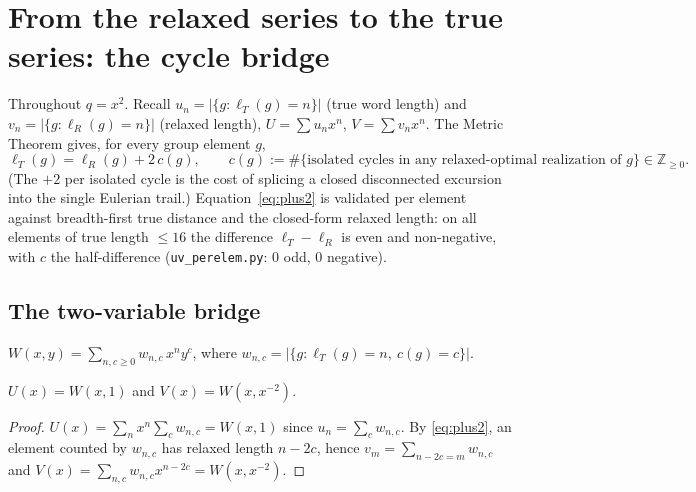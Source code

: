 
\section{From the relaxed series to the true series: the cycle bridge}
\label{sec:lifting}

Throughout $q=x^{2}$.  Recall $u_n=|\{g:\ell_T(g)=n\}|$ (true word length) and
$v_n=|\{g:\ell_R(g)=n\}|$ (relaxed length), $U=\sum u_nx^n$, $V=\sum v_nx^n$.
The Metric Theorem gives, for every group element $g$,
\begin{equation}\label{eq:plus2}
  \ell_T(g)=\ell_R(g)+2\,c(g),\qquad
  c(g):=\#\{\text{isolated cycles in any relaxed-optimal realization of }g\}\in\mathbb Z_{\ge0}.
\end{equation}
(The $+2$ per isolated cycle is the cost of splicing a closed disconnected excursion
into the single Eulerian trail.)  Equation~\eqref{eq:plus2} is validated per element
against breadth-first true distance and the closed-form relaxed length: on all
elements of true length $\le 16$ the difference $\ell_T-\ell_R$ is even and
non-negative, with $c$ the half-difference (\texttt{uv\_perelem.py}: $0$ odd, $0$
negative).

\subsection{The two-variable bridge}

\begin{definition}
$\displaystyle W(x,y)=\sum_{n,c\ge0}w_{n,c}\,x^{n}y^{c}$, where
$w_{n,c}=|\{g:\ell_T(g)=n,\ c(g)=c\}|$.
\end{definition}

\begin{proposition}[Bridge]\label{prop:bridge}
$U(x)=W(x,1)$ and $V(x)=W(x,x^{-2})$.
\end{proposition}

\begin{proof}
$U(x)=\sum_n x^n\sum_c w_{n,c}=W(x,1)$ since $u_n=\sum_c w_{n,c}$.  By
\eqref{eq:plus2}, an element counted by $w_{n,c}$ has relaxed length $n-2c$, hence
$v_m=\sum_{n-2c=m}w_{n,c}$ and $V(x)=\sum_{n,c}w_{n,c}x^{n-2c}=W(x,x^{-2})$.
\end{proof}

